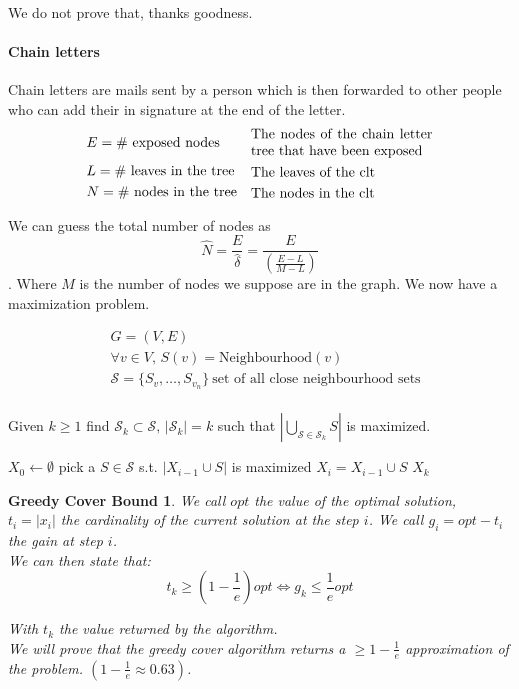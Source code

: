 \documentclass[]{article}
\begin{document}
We do not prove that, thanks goodness.

\paragraph{Chain letters} Chain letters are mails sent by a person which is then forwarded to other people who can add their in signature at the end of the letter.
\begin{align*}
&E = \text{\# exposed nodes} &\parbox{13em}{The nodes of the chain letter tree that have been exposed}\\
&L = \text{\# leaves in the tree}&\parbox{13em}{The leaves of the clt}\\
&N = \text{\# nodes in the tree}&\parbox{13em}{The nodes in the clt}\\
\end{align*}

We can guess the total number of nodes as \[\hat{N} = \frac{E}{\hat{\delta}} = \frac{E}{\left(\frac{E-L}{M-L}\right)} \]. Where $M$ is the number of nodes we suppose are in the graph. We now have a maximization problem.

\begin{align*}
&G = (V, E)\\
&\forall v \in V,\, S(v) = \text{Neighbourhood}(v)\\
&\mathscr{S} = \{S_v, \dots ,S_{v_n} \}\ \text{set of all close neighbourhood sets}\\
\end{align*}

Given $k\geq 1$ find $\mathscr{S}_k \subset \mathscr{S},\, |\mathscr{S}_k| = k$ such that $|\bigcup\limits_{\mathscr{S}\in \mathscr{S}_k} S|$ is maximized.

\begin{algorithm}[H]
	\caption{Greedy-Cover(neighbourhood set: $\mathscr{S}$, int: k) }
	\label{alg:greedy-cover}
	\begin{algorithmic}
		\STATE $X_0 \leftarrow \emptyset$
			\STATE pick a $S \in \mathscr{S}$ s.t. $|X_{i-1} \cup S|$ is maximized
			\STATE $X_i = X_{i-1} \cup S$
		\ENDFOR
		\RETURN $X_k$
	\end{algorithmic}
\end{algorithm}

\newtheorem{greedycover}{Greedy Cover Bound}

\begin{greedycover}
	We call  $opt$ the value of the optimal solution,\\ $t_i = |x_i|$ the cardinality of the current solution at the step $i$. We call $g_i = opt - t_i$ the gain at step $i$. \\We can then state that: 
	\[
		t_k \geq \left(1-\frac{1}{e}\right)opt \iff g_k \leq \frac{1}{e}opt
	\]
	
	With $t_k$ the value returned by the algorithm.\\
	We will prove that the greedy cover algorithm returns a $\geq 1-\frac{1}{e}$ approximation of the problem.  $\left(1-\frac{1}{e} \approx 0.63\right)$. 
\end{greedycover}
\end{document}
